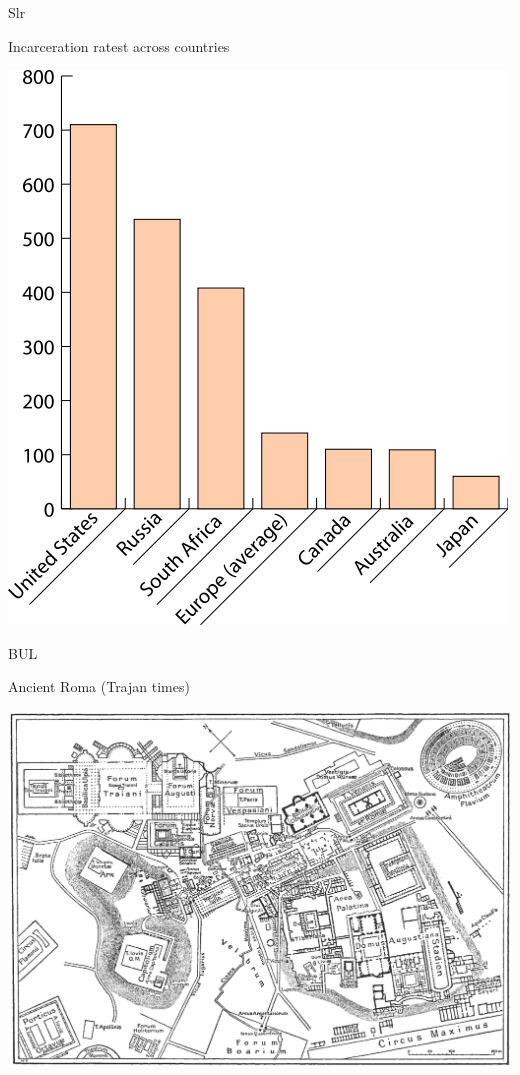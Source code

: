 \documentclass[print,Draft]{faosyb}
\begin{document}
\begin{chart}{S}{lr}
\caption{Incarceration ratest across countries}
\label{chart:incarceration}
\includegraphics[width=\chartwidth,height=\chartheight]{incarceration}  
\end{chart}


\begin{map}{B}{UL}
\caption{Ancient Roma  (Trajan times)}
\label{map:roma}
\includegraphics[width=\chartwidth,height=\chartheight]{Rome}
\end{map}
\end{document}
